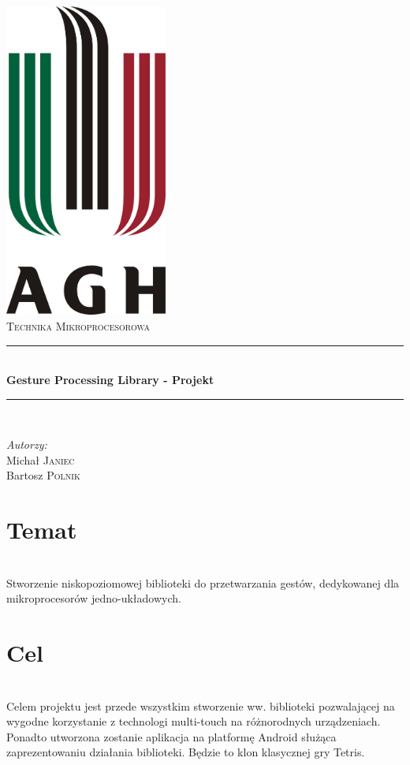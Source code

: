 \documentclass[a4paper,12pt]{article}
\newcommand{\HRule}{\rule{\linewidth}{0.5mm}}
\begin{document}
\begin{titlepage}
	\begin{center}
		\includegraphics[width=0.4\textwidth]{data/logo.jpg} \\[1cm]
		\textsc{\LARGE Technika Mikroprocesorowa} \\[0.8cm]
		\HRule \\[0.4cm]
		{ \huge \bfseries Gesture Processing Library - Projekt} \\[0.4cm] %
		\HRule \\[1.5cm]
	\end{center}
	\begin{minipage}{0.4\textwidth}
		\begin{flushleft} \large
		\emph{Autorzy:} \\
		Michał \textsc{Janiec} \\
		Bartosz \textsc{Polnik}
		\end{flushleft}
	\end{minipage}
\end{titlepage}
\thispagestyle{empty}



\section{\Large Temat} \ \\[0.1cm]
\indent Stworzenie niskopoziomowej biblioteki do przetwarzania gestów, dedykowanej dla mikroprocesorów jedno-układowych.

\section{\Large Cel} \ \\[0.1cm]
\indent Celem projektu jest przede wszystkim stworzenie ww. biblioteki pozwalającej na wygodne korzystanie z technologi multi-touch na różnorodnych urządzeniach. Ponadto utworzona zostanie aplikacja na platformę Android służąca zaprezentowaniu działania biblioteki. Będzie to klon klasycznej gry Tetris.
\end{document}
